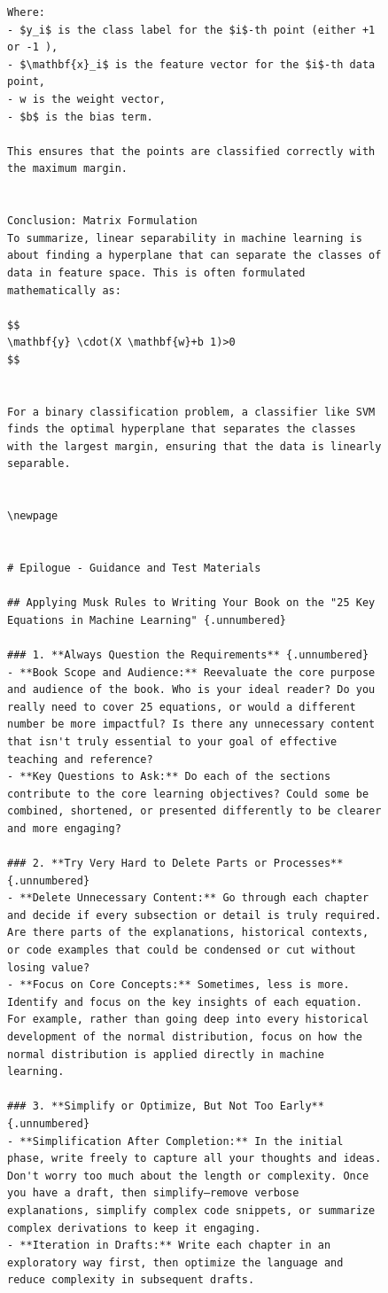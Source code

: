 \documentclass[
  12 pt,
  a4paper,
]{book}
\numberwithin{equation}{section}
\theoremstyle{plain}      %
\theoremstyle{definition} %
\theoremstyle{remark}     %
\theoremstyle{note}         %
\begin{document}
\begin{figure}
\begin{verbatim}
Where:
- $y_i$ is the class label for the $i$-th point (either +1 or -1 ),
- $\mathbf{x}_i$ is the feature vector for the $i$-th data point,
- w is the weight vector,
- $b$ is the bias term.

This ensures that the points are classified correctly with the maximum margin.


Conclusion: Matrix Formulation
To summarize, linear separability in machine learning is about finding a hyperplane that can separate the classes of data in feature space. This is often formulated mathematically as:

$$
\mathbf{y} \cdot(X \mathbf{w}+b 1)>0
$$


For a binary classification problem, a classifier like SVM finds the optimal hyperplane that separates the classes with the largest margin, ensuring that the data is linearly separable.


\newpage 


# Epilogue - Guidance and Test Materials

## Applying Musk Rules to Writing Your Book on the "25 Key Equations in Machine Learning" {.unnumbered}

### 1. **Always Question the Requirements** {.unnumbered}
- **Book Scope and Audience:** Reevaluate the core purpose and audience of the book. Who is your ideal reader? Do you really need to cover 25 equations, or would a different number be more impactful? Is there any unnecessary content that isn't truly essential to your goal of effective teaching and reference?
- **Key Questions to Ask:** Do each of the sections contribute to the core learning objectives? Could some be combined, shortened, or presented differently to be clearer and more engaging?

### 2. **Try Very Hard to Delete Parts or Processes** {.unnumbered}
- **Delete Unnecessary Content:** Go through each chapter and decide if every subsection or detail is truly required. Are there parts of the explanations, historical contexts, or code examples that could be condensed or cut without losing value?
- **Focus on Core Concepts:** Sometimes, less is more. Identify and focus on the key insights of each equation. For example, rather than going deep into every historical development of the normal distribution, focus on how the normal distribution is applied directly in machine learning.

### 3. **Simplify or Optimize, But Not Too Early** {.unnumbered}
- **Simplification After Completion:** In the initial phase, write freely to capture all your thoughts and ideas. Don't worry too much about the length or complexity. Once you have a draft, then simplify—remove verbose explanations, simplify complex code snippets, or summarize complex derivations to keep it engaging.
- **Iteration in Drafts:** Write each chapter in an exploratory way first, then optimize the language and reduce complexity in subsequent drafts.


\end{verbatim}
\end{figure}
\end{document}
